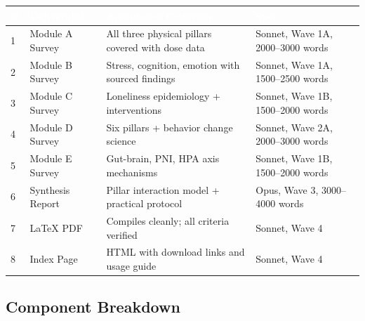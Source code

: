 \documentclass[11pt,letterpaper]{article}
\newcommand{\tableheader}[1]{\textbf{\sffamily\textcolor{white}{#1}}}
\begin{document}
\begin{center}
\begin{tabularx}{\textwidth}{C{0.5cm}L{4cm}L{4cm}X}
\toprule
{}
\tableheader{\#} & \tableheader{Deliverable} & \tableheader{Acceptance Criterion} & \tableheader{Spec} \\
 & Module A Survey & All three physical pillars covered with dose data & Sonnet, Wave 1A, 2000--3000 words \\
2 & Module B Survey & Stress, cognition, emotion with sourced findings & Sonnet, Wave 1A, 1500--2500 words \\
3 & Module C Survey & Loneliness epidemiology + interventions & Sonnet, Wave 1B, 1500--2000 words \\
4 & Module D Survey & Six pillars + behavior change science & Sonnet, Wave 2A, 2000--3000 words \\
5 & Module E Survey & Gut-brain, PNI, HPA axis mechanisms & Sonnet, Wave 1B, 1500--2000 words \\
6 & Synthesis Report & Pillar interaction model + practical protocol & Opus, Wave 3, 3000--4000 words \\
7 & LaTeX PDF & Compiles cleanly; all criteria verified & Sonnet, Wave 4 \\
8 & Index Page & HTML with download links and usage guide & Sonnet, Wave 4 \\
\bottomrule
\end{tabularx}
\end{center}

\subsection{Component Breakdown}
\end{document}
